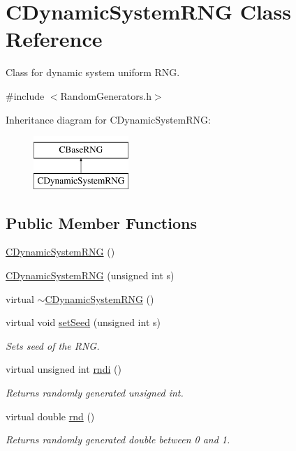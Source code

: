 \hypertarget{class_c_dynamic_system_r_n_g}{\section{C\-Dynamic\-System\-R\-N\-G Class Reference}
\label{class_c_dynamic_system_r_n_g}
}


Class for dynamic system uniform R\-N\-G.  




{\ttfamily \#include $<$Random\-Generators.\-h$>$}

Inheritance diagram for C\-Dynamic\-System\-R\-N\-G\-:\begin{figure}[H]
\begin{center}
\leavevmode
\includegraphics[height=2.000000cm]{class_c_dynamic_system_r_n_g}
\end{center}
\end{figure}
\subsection*{Public Member Functions}
\begin{DoxyCompactItemize}
\item 
\hyperlink{class_c_dynamic_system_r_n_g_af741112362509e7b12847b2d64d91d00}{C\-Dynamic\-System\-R\-N\-G} ()
\item 
\hyperlink{class_c_dynamic_system_r_n_g_a65373945f8ff6500313a43f866e60cd4}{C\-Dynamic\-System\-R\-N\-G} (unsigned int s)
\item 
virtual \hyperlink{class_c_dynamic_system_r_n_g_aa52982d8508d10e94de71e2f3c3f2ad5}{$\sim$\-C\-Dynamic\-System\-R\-N\-G} ()
\item 
virtual void \hyperlink{class_c_dynamic_system_r_n_g_a2ed468a45094e3c0591e0029b1359df1}{set\-Seed} (unsigned int s)
\begin{DoxyCompactList}\small\item\em Sets seed of the R\-N\-G. \end{DoxyCompactList}\item 
virtual unsigned int \hyperlink{class_c_dynamic_system_r_n_g_a703c33a722eb6808771245955e19b3e1}{rndi} ()
\begin{DoxyCompactList}\small\item\em Returns randomly generated unsigned int. \end{DoxyCompactList}\item 
virtual double \hyperlink{class_c_dynamic_system_r_n_g_af22e28ce058d489e0b73b08033db87b8}{rnd} ()
\begin{DoxyCompactList}\small\item\em Returns randomly generated double between 0 and 1. \end{DoxyCompactList}\end{DoxyCompactItemize}
